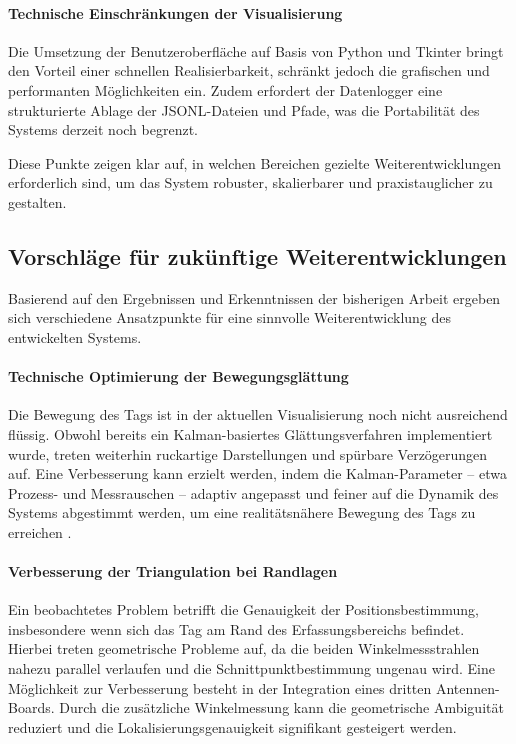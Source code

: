 \documentclass[a4paper, 12pt]{article} %
\begin{document}
\paragraph{Technische Einschränkungen der Visualisierung}
Die Umsetzung der Benutzeroberfläche auf Basis von Python und Tkinter bringt den Vorteil einer schnellen Realisierbarkeit, schränkt jedoch die 
grafischen und performanten Möglichkeiten ein. Zudem erfordert der Datenlogger eine strukturierte Ablage der \ac{JSONL}-Dateien und Pfade, was die 
Portabilität des Systems derzeit noch begrenzt.

Diese Punkte zeigen klar auf, in welchen Bereichen gezielte Weiterentwicklungen erforderlich sind, um das System robuster, skalierbarer und 
praxistauglicher zu gestalten.

\subsection{Vorschläge für zukünftige Weiterentwicklungen}

Basierend auf den Ergebnissen und Erkenntnissen der bisherigen Arbeit ergeben sich verschiedene Ansatzpunkte für eine sinnvolle Weiterentwicklung
des entwickelten Systems.

\paragraph{Technische Optimierung der Bewegungsglättung}
Die Bewegung des Tags ist in der aktuellen Visualisierung noch nicht ausreichend flüssig. Obwohl bereits ein Kalman-basiertes Glättungsverfahren 
implementiert wurde, treten weiterhin ruckartige Darstellungen und spürbare Verzögerungen auf. Eine Verbesserung kann erzielt werden, indem die 
Kalman-Parameter – etwa Prozess- und Messrauschen – adaptiv angepasst und feiner auf die Dynamik des Systems abgestimmt werden, um eine realitätsnähere
 Bewegung des Tags zu erreichen \cite{kalman_filter_book}.

\paragraph{Verbesserung der Triangulation bei Randlagen}
Ein beobachtetes Problem betrifft die Genauigkeit der Positionsbestimmung, insbesondere wenn sich das Tag am Rand des Erfassungsbereichs befindet. 
Hierbei treten geometrische Probleme auf, da die beiden Winkelmessstrahlen nahezu parallel verlaufen und die Schnittpunktbestimmung ungenau wird. 
Eine Möglichkeit zur Verbesserung besteht in der Integration eines dritten Antennen-Boards. Durch die zusätzliche Winkelmessung kann die geometrische 
Ambiguität reduziert und die Lokalisierungsgenauigkeit signifikant gesteigert werden.
\end{document}
